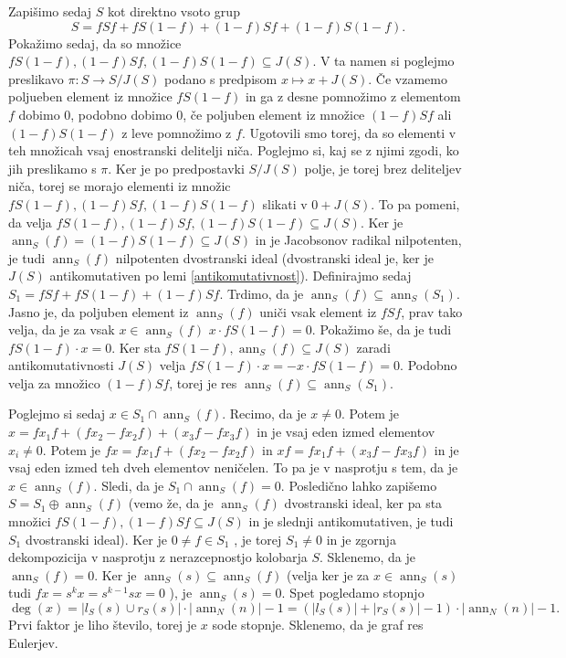 \documentclass[a4paper, 12pt]{amsart}
\theoremstyle{definition} %
\theoremstyle{plain} %
\DeclareMathOperator{\ann}{ann}
\begin{document}
Zapišimo sedaj $S$ kot direktno vsoto grup
$$
S = fSf + fS(1-f) + (1-f)Sf + (1-f)S(1-f).
$$
Pokažimo sedaj, da so množice  $fS(1-f), (1-f)Sf, (1-f)S(1-f) \subseteq J(S)$. V ta namen si poglejmo preslikavo $\pi : S \rightarrow S/J(S)$ podano s predpisom $x\mapsto x+J(S)$. Če vzamemo poljueben element iz množice $fS(1-f)$ in ga z desne pomnožimo z elementom $f$ dobimo 0, podobno dobimo 0, če poljuben element iz množice $(1-f)Sf$ ali $(1-f)S(1-f)$ z leve pomnožimo z $f$. Ugotovili smo torej, da so elementi v teh množicah vsaj enostranski delitelji niča. Poglejmo si, kaj se z njimi zgodi, ko jih preslikamo s $\pi$. Ker je po predpostavki $S/J(S)$ polje, je torej brez deliteljev niča, torej se morajo elementi iz množic $fS(1-f), (1-f)Sf, (1-f)S(1-f)$ slikati v $0+J(S)$. To pa pomeni, da velja $fS(1-f), (1-f)Sf, (1-f)S(1-f) \subseteq J(S)$. Ker je $\ann_S(f) = (1-f)S(1-f) \subseteq J(S)$ in je Jacobsonov radikal nilpotenten, je tudi $\ann_S(f)$ nilpotenten dvostranski ideal (dvostranski ideal je, ker je $J(S)$ antikomutativen po lemi \ref{antikomutativnost}). Definirajmo sedaj $S_1 = fSf + fS(1-f) + (1-f)Sf$. Trdimo, da je $\ann_S(f) \subseteq \ann_S(S_1)$. Jasno je, da poljuben element iz $\ann_S(f)$ uniči vsak element iz $fSf$, prav tako velja, da je za vsak $x\in \ann_S(f)$ $x\cdot fS(1-f) = 0$. Pokažimo še, da je tudi $fS(1-f) \cdot x = 0$. Ker sta $fS(1-f), \ann_S(f)\subseteq J(S)$ zaradi antikomutativnosti $J(S)$ velja $fS(1-f) \cdot x = - x\cdot fS(1-f) = 0$. Podobno velja za množico $(1-f)Sf$, torej je res $\ann_S(f) \subseteq \ann_S(S_1)$. 

Poglejmo si sedaj $x\in S_1 \cap \ann_S(f) $. Recimo, da je $x\neq0 $. Potem je $x = fx_1 f + (fx_2 - fx_2 f) + (x_3 f - fx_3 f)$ in je vsaj eden izmed elementov $x_i \neq 0$. Potem je $fx = fx_1 f + (fx_2 - fx_2 f ) $ in $xf = fx_1f + (x_3f - fx_3f)$ in je vsaj eden izmed teh dveh elementov neničelen. To pa je v nasprotju s tem, da je $x\in \ann_S(f)$. Sledi, da je $S_1 \cap \ann_S(f) = 0$. Posledično lahko zapišemo $S = S_1 \oplus \ann_S(f)$ (vemo že, da je $\ann_S(f)$ dvostranski ideal, ker pa sta množici $fS(1-f),(1-f)Sf \subseteq J(S) $ in je slednji antikomutativen, je tudi $S_1$ dvostranski ideal). Ker je $0\neq f\in S_1$ , je torej $S_1\neq 0$ in je zgornja dekompozicija v nasprotju z nerazcepnostjo kolobarja $S$. Sklenemo, da je $\ann_S(f) = 0$. Ker je $\ann_S(s) \subseteq \ann_S(f)$ (velja ker je za $x\in \ann_S(s)$ tudi $fx = s^k x = s^{k-1 } sx = 0$ ), je $\ann_S(s) = 0$. Spet pogledamo stopnjo
$$
\deg(x) = |l_S(s) \cup r_S(s)|\cdot |\ann_N(n)|-1 = (|l_S(s) | + |r_S(s)|-1)\cdot |\ann_N(n)| - 1.
$$
Prvi faktor je liho število, torej je $x$ sode stopnje. Sklenemo, da je graf res Eulerjev.
\end{document}
